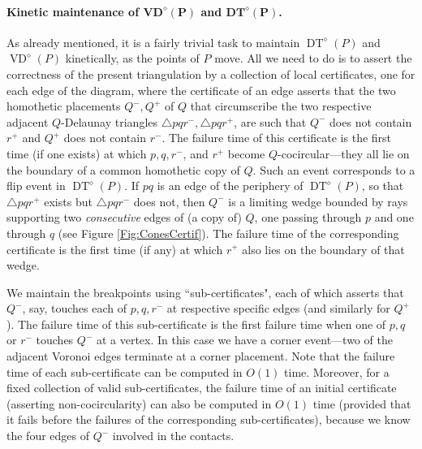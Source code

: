 \documentclass[letter,11pt]{article}
\def\poly{\diamond}
\def\DT{\mathop{\mathrm{DT}}}
\def\VD{\mathop{\mathrm{VD}}}
\begin{document}
\paragraph{Kinetic maintenance of $\mathbf{VD^\poly(P)}$ and 
$\mathbf{DT^\poly(P)}$.}
As already mentioned, it is a fairly trivial task to maintain 
$\DT^\poly(P)$ and $\VD^\poly(P)$ kinetically, as the points of $P$ 
move. All we need to do is to assert the correctness of the present 
triangulation by a collection of local certificates, one for each edge 
of the diagram, where the certificate of an edge asserts that the two 
homothetic placements $Q^-,Q^+$ of $Q$ that circumscribe the two 
respective adjacent $Q$-Delaunay triangles 
$\triangle pqr^-,\triangle pqr^+$, are such that $Q^-$ does not 
contain $r^+$ and $Q^+$ does not contain $r^-$. The failure time of this certificate is the first time (if one exists) at which $p,q,r^-$, and $r^+$ become $Q$-cocircular---they all lie on the boundary of a common homothetic copy of $Q$. Such an event corresponds to a flip event in $\DT^\poly(P)$. If $pq$ is an edge of the periphery of $\DT^\poly(P)$, so that $\triangle pqr^+$ exists but $\triangle pqr^-$ does not, then $Q^-$ is a limiting wedge bounded by rays supporting two {\it consecutive} edges of (a copy of) $Q$, one passing through $p$ and one through $q$ (see Figure \ref{Fig:ConesCertif}).
The failure time of the corresponding certificate is the first time (if any) at which $r^+$ also lies on the boundary of that wedge.


We maintain the breakpoints using ``sub-certificates", each of which asserts that $Q^-$, say, touches each of $p,q,r^-$ at respective specific edges (and similarly for $Q^+$). The failure time of this sub-certificate is the first failure time when one of $p,q$ or $r^-$ touches $Q^-$ at a vertex. In this case we have a corner event---two of the adjacent Voronoi edges terminate at a corner placement. Note that the failure time of each sub-certificate can be computed in $O(1)$ time. Moreover, for a fixed collection of valid sub-certificates, the failure time of an initial certificate (asserting non-cocircularity) can also be computed in $O(1)$ time (provided that it fails before the failures of the corresponding sub-certificates), because we know the four edges of $Q^-$ involved in the contacts.
\end{document}
